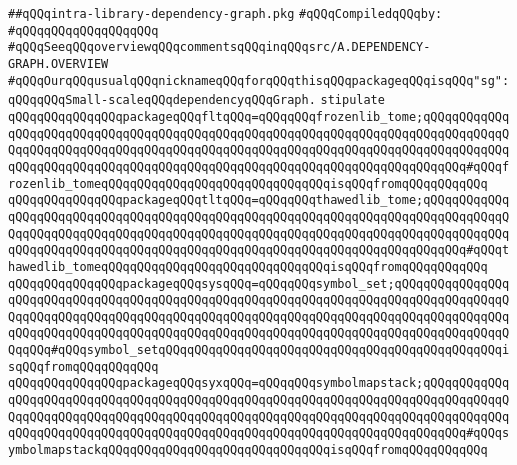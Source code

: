 \label{src/app/makelib/depend/intra-library-dependency-graph.pkg}
\verb|##qQQqintra-library-dependency-graph.pkg|\newline
\newline
\verb|#qQQqCompiledqQQqby:|\newline
\verb|#qQQqqQQqqQQqqQQqqQQq|\newline
\newline
\verb|#qQQqSeeqQQqoverviewqQQqcommentsqQQqinqQQqsrc/A.DEPENDENCY-GRAPH.OVERVIEW|\newline
\newline
\verb|#qQQqOurqQQqusualqQQqnicknameqQQqforqQQqthisqQQqpackageqQQqisqQQq"sg":qQQqqQQqSmall-scaleqQQqdependencyqQQqGraph.|\newline
\newline
\newline
\newline
\verb|stipulate|\newline
\verb|qQQqqQQqqQQqqQQqpackageqQQqfltqQQq=qQQqqQQqfrozenlib_tome;qQQqqQQqqQQqqQQqqQQqqQQqqQQqqQQqqQQqqQQqqQQqqQQqqQQqqQQqqQQqqQQqqQQqqQQqqQQqqQQqqQQqqQQqqQQqqQQqqQQqqQQqqQQqqQQqqQQqqQQqqQQqqQQqqQQqqQQqqQQqqQQqqQQqqQQqqQQqqQQqqQQqqQQqqQQqqQQqqQQqqQQqqQQqqQQqqQQqqQQqqQQqqQQqqQQqqQQq#qQQqfrozenlib_tomeqQQqqQQqqQQqqQQqqQQqqQQqqQQqqQQqisqQQqfromqQQqqQQqqQQq|\newline
\verb|qQQqqQQqqQQqqQQqpackageqQQqtltqQQq=qQQqqQQqthawedlib_tome;qQQqqQQqqQQqqQQqqQQqqQQqqQQqqQQqqQQqqQQqqQQqqQQqqQQqqQQqqQQqqQQqqQQqqQQqqQQqqQQqqQQqqQQqqQQqqQQqqQQqqQQqqQQqqQQqqQQqqQQqqQQqqQQqqQQqqQQqqQQqqQQqqQQqqQQqqQQqqQQqqQQqqQQqqQQqqQQqqQQqqQQqqQQqqQQqqQQqqQQqqQQqqQQqqQQqqQQq#qQQqthawedlib_tomeqQQqqQQqqQQqqQQqqQQqqQQqqQQqqQQqisqQQqfromqQQqqQQqqQQq|\newline
\verb|qQQqqQQqqQQqqQQqpackageqQQqsysqQQq=qQQqqQQqsymbol_set;qQQqqQQqqQQqqQQqqQQqqQQqqQQqqQQqqQQqqQQqqQQqqQQqqQQqqQQqqQQqqQQqqQQqqQQqqQQqqQQqqQQqqQQqqQQqqQQqqQQqqQQqqQQqqQQqqQQqqQQqqQQqqQQqqQQqqQQqqQQqqQQqqQQqqQQqqQQqqQQqqQQqqQQqqQQqqQQqqQQqqQQqqQQqqQQqqQQqqQQqqQQqqQQqqQQqqQQqqQQqqQQqqQQqqQQq#qQQqsymbol_setqQQqqQQqqQQqqQQqqQQqqQQqqQQqqQQqqQQqqQQqqQQqqQQqisqQQqfromqQQqqQQqqQQq|\newline
\verb|qQQqqQQqqQQqqQQqpackageqQQqsyxqQQq=qQQqqQQqsymbolmapstack;qQQqqQQqqQQqqQQqqQQqqQQqqQQqqQQqqQQqqQQqqQQqqQQqqQQqqQQqqQQqqQQqqQQqqQQqqQQqqQQqqQQqqQQqqQQqqQQqqQQqqQQqqQQqqQQqqQQqqQQqqQQqqQQqqQQqqQQqqQQqqQQqqQQqqQQqqQQqqQQqqQQqqQQqqQQqqQQqqQQqqQQqqQQqqQQqqQQqqQQqqQQqqQQqqQQqqQQq#qQQqsymbolmapstackqQQqqQQqqQQqqQQqqQQqqQQqqQQqqQQqisqQQqfromqQQqqQQqqQQq|\newline
